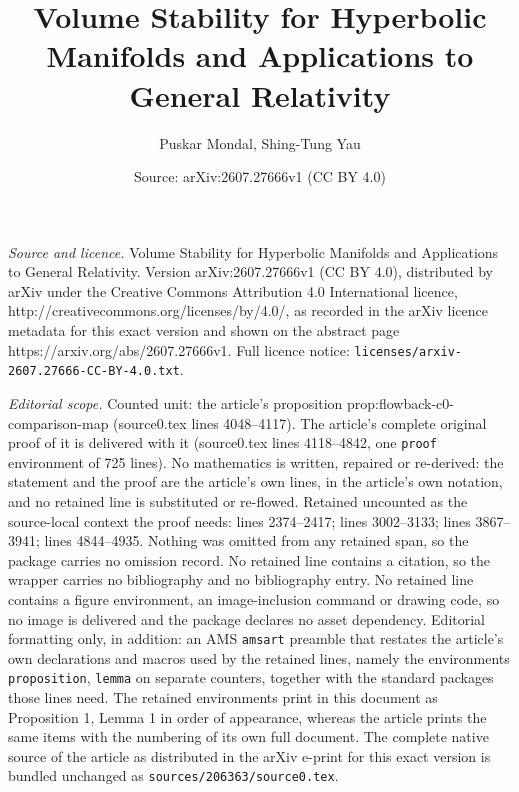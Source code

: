 \documentclass[10pt,a4paper]{amsart}
\title{Volume Stability for Hyperbolic Manifolds and Applications to General Relativity}
\author{Puskar Mondal, Shing-Tung Yau}
\date{Source: arXiv:2607.27666v1 (CC BY 4.0)}
\begin{document}
\maketitle

\noindent\emph{Source and licence.} Volume Stability for Hyperbolic Manifolds and Applications to General Relativity. Version arXiv:2607.27666v1 (CC BY 4.0), distributed by arXiv under the Creative Commons Attribution 4.0 International licence, http://creativecommons.org/licenses/by/4.0/, as recorded in the arXiv licence metadata for this exact version and shown on the abstract page https://arxiv.org/abs/2607.27666v1. Full licence notice: \texttt{licenses/arxiv-2607.27666-CC-BY-4.0.txt}.\par\smallskip

\noindent\textit{Editorial scope.} Counted unit: the article's proposition prop:flowback-c0-comparison-map (source0.tex lines 4048--4117). The article's complete original proof of it is delivered with it (source0.tex lines 4118--4842, one \texttt{proof} environment of 725 lines). No mathematics is written, repaired or re-derived: the statement and the proof are the article's own lines, in the article's own notation, and no retained line is substituted or re-flowed.  Retained uncounted as the source-local context the proof needs: lines 2374--2417; lines 3002--3133; lines 3867--3941; lines 4844--4935.  Nothing was omitted from any retained span, so the package carries no omission record.  No retained line contains a citation, so the wrapper carries no bibliography and no bibliography entry.  No retained line contains a figure environment, an image-inclusion command or drawing code, so no image is delivered and the package declares no asset dependency.  Editorial formatting only, in addition: an AMS \texttt{amsart} preamble that restates the article's own declarations and macros used by the retained lines, namely the environments \texttt{proposition}, \texttt{lemma} on separate counters, together with the standard packages those lines need.  The retained environments print in this document as Proposition 1, Lemma 1 in order of appearance, whereas the article prints the same items with the numbering of its own full document.  The complete native source of the article as distributed in the arXiv e-print for this exact version is bundled unchanged as \texttt{sources/206363/source0.tex}.
\end{document}
